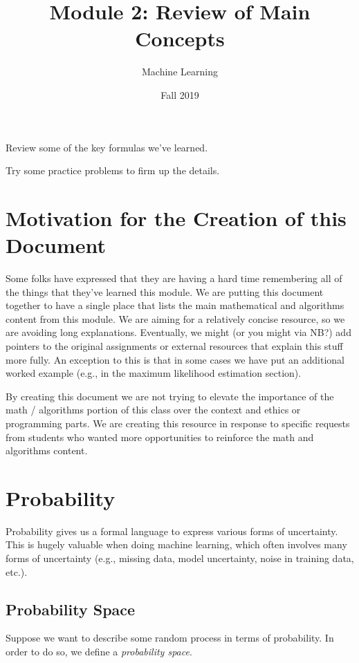 \documentclass{tufte-handout}
\title{Module 2: Review of Main Concepts}
\author{Machine Learning}
\date{Fall 2019}
\begin{document}
\maketitle
\thispagestyle{firstpage}

\begin{learningobjectives}
\bi
\item Review some of the key formulas we've learned.
\item Try some practice problems to firm up the details.
\ei
\end{learningobjectives}

\section{Motivation for the Creation of this Document}

Some folks have expressed that they are having a hard time remembering all of the things that they've learned this module.  We are putting this document together to have a single place that lists the main mathematical and algorithms content from this module.  We are aiming for a relatively concise resource, so we are avoiding long explanations.  Eventually, we might (or you might via NB?) add pointers to the original assignments or external resources that explain this stuff more fully.  An exception to this is that in some cases we have put an additional worked example (e.g., in the maximum likelihood estimation section).

\vspace{1em}
\begin{notice}
By creating this document we are not trying to elevate the importance of the math / algorithms portion of this class over the context and ethics or programming parts.  We are creating this resource in response to specific requests from students who wanted more opportunities to reinforce the math and algorithms content.
\end{notice}

\section{Probability}

Probability gives us a formal language to express various forms of uncertainty.  This is hugely valuable when doing machine learning, which often involves many forms of uncertainty (e.g., missing data, model uncertainty, noise in training data, etc.).

\subsection{Probability Space}
Suppose we want to describe some random process in terms of probability.  In order to do so, we define a \emph{probability space}.
\end{document}
